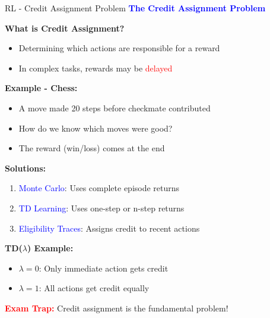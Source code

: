 \documentclass[8pt]{beamer}
\begin{document}
\begin{frame}{RL - Credit Assignment Problem}
\fontsize{6.5}{7.5}\selectfont
\textcolor{blue}{\textbf{The Credit Assignment Problem}}

\textbf{What is Credit Assignment?}
\begin{itemize}
\item Determining which actions are responsible for a reward
\item In complex tasks, rewards may be \textcolor{red}{delayed}
\end{itemize}

\textbf{Example - Chess:}
\begin{itemize}
\item A move made 20 steps before checkmate contributed
\item How do we know which moves were good?
\item The reward (win/loss) comes at the end
\end{itemize}

\textbf{Solutions:}
\begin{enumerate}
\item \textcolor{blue}{Monte Carlo}: Uses complete episode returns
\item \textcolor{blue}{TD Learning}: Uses one-step or n-step returns
\item \textcolor{blue}{Eligibility Traces}: Assigns credit to recent actions
\end{enumerate}

\textbf{TD($\lambda$) Example:}
\begin{itemize}
\item $\lambda = 0$: Only immediate action gets credit
\item $\lambda = 1$: All actions get credit equally
\end{itemize}

\textcolor{red}{\textbf{Exam Trap:}} Credit assignment is the fundamental problem!
\end{frame}
\end{document}
